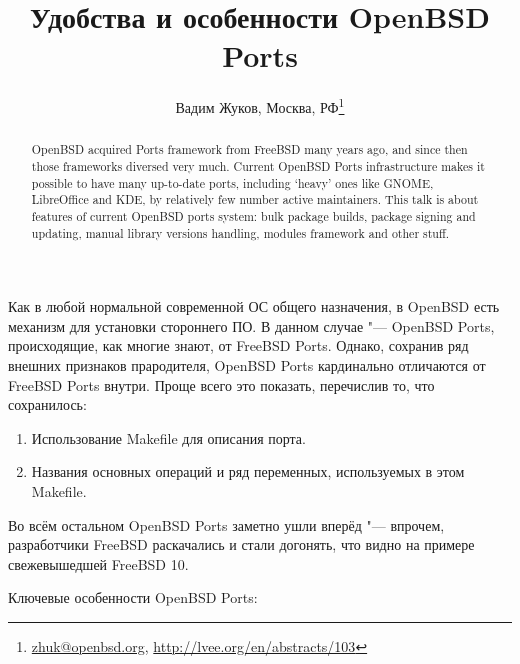 \documentclass[10pt, a5paper]{article}
\begin{document}
\def\v!#1!{\texttt{#1}}
\title{Удобства и особенности OpenBSD Ports}
\author{Вадим Жуков, Москва, РФ\footnote{\url{zhuk@openbsd.org}, \url{http://lvee.org/en/abstracts/103}}}
\maketitle
\begin{abstract}
OpenBSD acquired Ports framework from FreeBSD many years ago, and since then those frameworks diversed very much. Current OpenBSD Ports infrastructure makes it possible to have many up-to-date ports, including ‘heavy’ ones like GNOME, LibreOffice and KDE, by relatively few number active maintainers. This talk is about features of current OpenBSD ports system: bulk package builds, package signing and updating, manual library versions handling, modules framework and other stuff.
\end{abstract}
Как в любой нормальной современной ОС общего назначения, в OpenBSD есть механизм для установки стороннего ПО. В данном случае "--- OpenBSD Ports, происходящие, как многие знают, от FreeBSD Ports. Однако, сохранив ряд внешних признаков прародителя, OpenBSD Ports кардинально отличаются от FreeBSD Ports внутри. Проще всего это показать, перечислив то, что сохранилось:

\begin{enumerate}
  \item Использование Makefile для описания порта.
  \item Названия основных операций и ряд переменных, используемых в этом Makefile.
\end{enumerate}

Во всём остальном OpenBSD Ports заметно ушли вперёд "--- впрочем, разработчики FreeBSD раскачались и стали догонять, что видно на примере свежевышедшей FreeBSD 10.

Ключевые особенности OpenBSD Ports:
\end{document}
